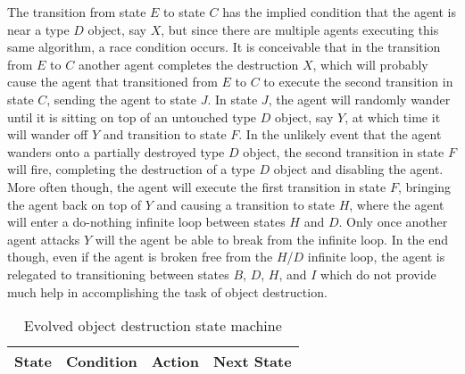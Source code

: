 The transition from state $E$ to state $C$ has the implied condition that the agent is near a type $D$ object, say \textit{$X$}, but since there are multiple agents executing this same algorithm, a race condition occurs.  It is conceivable that in the transition from $E$ to $C$ another agent completes the destruction \textit{$X$}, which will probably cause the agent that transitioned from $E$ to $C$ to execute the second transition in state $C$, sending the agent to state $J$.  In state $J$, the agent will randomly wander until it is sitting on top of an untouched type $D$ object, say \textit{$Y$}, at which time it will wander off \textit{$Y$} and transition to state $F$.  In the unlikely event that the agent wanders onto a partially destroyed type $D$ object, the second transition in state $F$ will fire, completing the destruction of a type $D$ object and disabling the agent.  More often though, the agent will execute the first transition in state $F$, bringing the agent back on top of \textit{$Y$} and causing a transition to state $H$, where the agent will enter a do-nothing infinite loop between states $H$ and $D$.  Only once another agent attacks \textit{$Y$} will the agent be able to break from the infinite loop.  In the end though, even if the agent is broken free from the $H$/$D$ infinite loop, the agent is relegated to transitioning between states $B$, $D$, $H$, and $I$ which do not provide much help in accomplishing the task of object destruction.


\begin{table}[ht]
  \centering
  \small
  \begin{tabular}{|c|c|p{25ex}|c|}
    \hline
    State & Condition & Action & Next State \\
    \hline
    
  \end{tabular}
  \normalsize
  \caption{Evolved object destruction state machine}
  \label{tab:DestructionAlgorithm}
\end{table}

